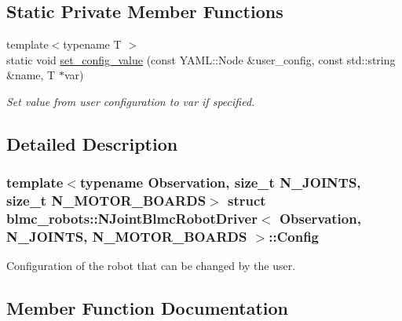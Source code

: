 \subsection*{Static Private Member Functions}
\begin{DoxyCompactItemize}
\item 
{\footnotesize template$<$typename T $>$ }\\static void \hyperlink{structblmc__robots_1_1NJointBlmcRobotDriver_1_1Config_acf6b753c2a2cbf8cedc97da4a5a0f83c}{set\+\_\+config\+\_\+value} (const Y\+A\+M\+L\+::\+Node \&user\+\_\+config, const std\+::string \&name, T $\ast$var)
\begin{DoxyCompactList}\small\item\em Set value from user configuration to var if specified. \end{DoxyCompactList}\end{DoxyCompactItemize}


\subsection{Detailed Description}
\subsubsection*{template$<$typename Observation, size\+\_\+t N\+\_\+\+J\+O\+I\+N\+TS, size\+\_\+t N\+\_\+\+M\+O\+T\+O\+R\+\_\+\+B\+O\+A\+R\+DS$>$\newline
struct blmc\+\_\+robots\+::\+N\+Joint\+Blmc\+Robot\+Driver$<$ Observation, N\+\_\+\+J\+O\+I\+N\+T\+S, N\+\_\+\+M\+O\+T\+O\+R\+\_\+\+B\+O\+A\+R\+D\+S $>$\+::\+Config}

Configuration of the robot that can be changed by the user. 

\subsection{Member Function Documentation}
\mbox{\label{structblmc__robots_1_1NJointBlmcRobotDriver_1_1Config_ae34fb8f28bdec0401b72b09bc8d48b65}} 
